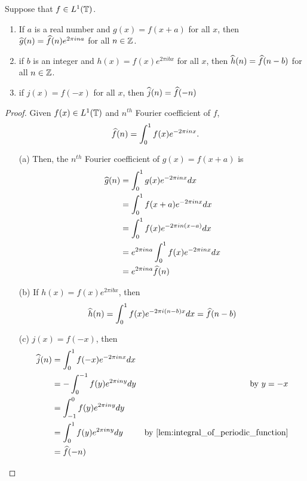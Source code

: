   \begin{proposition}
    \label{prop:properties_of_fourier_coefficients}
    Suppose that $f\in L^1(\mathbb T)$.
    \begin{enumerate}[label=(\alph*)]
      \item If $a$ is a real number and $g(x) = f(x+a)$ for all $x$, then $\widehat{g}(n) = \widehat{f}(n)e^{2\pi ina}$ for all $n \in \mathbb Z$.
      \item if $b$ is an integer and $h(x) = f(x)e^{2\pi i bx}$ for all $x$, then $\widehat{h}(n) = \widehat{f}(n-b)$ for all $n\in \mathbb Z$.
      \item if $j(x) = f(-x)$ for all $x$, then $\widehat{j}(n) = \widehat{f}(-n)$
    \end{enumerate}
  \end{proposition}
  \begin{proof}
     Given $f(x) \in L^1(\mathbb T)$ and $n^{th}$ Fourier coefficient of $f$,  
    \[\widehat{f}(n) = \int_{0}^{1}f(x)e^{-2 \pi inx}.\]
    \begin{enumerate}
      \item[(a)] Then, the $n^{th}$ Fourier coefficient of $g(x) = f(x+a)$ is
        \begin{align*}
          \widehat{g}(n) &= \int_{0}^{1}g(x)e^{-2\pi inx} dx \\
                &= \int_{0}^{1}f(x+a)e^{-2\pi inx} dx \\
                &= \int_{0}^{1}f(x)e^{-2\pi in(x-a)} dx \\
                &= e^{2\pi ina} \int_0^1 f(x)e^{-2\pi inx} dx \\
                &= e^{2\pi ina} \widehat{f}(n)
        \end{align*}

      \item[(b)] If $h(x) = f(x)e^{2\pi ibx}$, then
        \begin{displaymath}
          \widehat{h}(n) = \int_0^1 f(x)e^{-2 \pi i (n-b)x} dx = \widehat{f}(n-b)
        \end{displaymath}
      \item[(c)] $j(x) = f(-x)$, then
        \begin{align*}
          \hatj(n)  &= \int_0^1 f(-x)e^{-2\pi inx} dx \\
                    &= -\int_0^{-1} f(y) e^{2\pi iny}dy & \text{by } y=-x\\
                    &= \int_{-1}^0 f(y)e^{2\pi iny}dy \\
                    &= \int_0^1 f(y)e^{2\pi iny}dy & \text{by \autoref{lem:integral_of_periodic_function}}\\
                    &= \hatf(-n)
        \end{align*}
    \end{enumerate}
  \end{proof}


